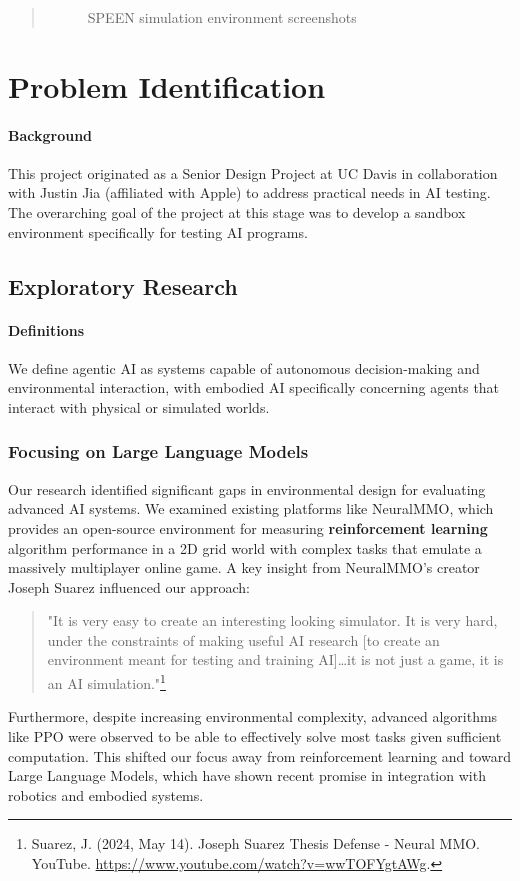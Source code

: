 \documentclass{article}
\begin{document}
\begin{abstract}
\begin{figure}[ht!]
\begin{minipage}[b]{0.49\textwidth}
        \end{minipage}
        \caption{SPEEN simulation environment screenshots}
        \label{fig:speen-environment}
    \end{figure}
\end{abstract}

\section{Problem Identification}

\paragraph{Background}
This project originated as a Senior Design Project at UC Davis in collaboration with Justin Jia (affiliated with Apple) to address practical needs in AI testing.
The overarching goal of the project at this stage was to develop a sandbox environment specifically for testing AI programs.

\subsection{Exploratory Research}

\paragraph{Definitions}
We define agentic AI as systems capable of autonomous decision-making and environmental interaction, with embodied AI specifically concerning agents that interact with physical or simulated worlds.

\subsubsection{Focusing on Large Language Models}
Our research identified significant gaps in environmental design for evaluating advanced AI systems.
We examined existing platforms like NeuralMMO, which provides an open-source environment for measuring \textbf{reinforcement learning} algorithm performance in a 2D grid world with complex tasks that emulate a massively multiplayer online game.
A key insight from NeuralMMO's creator Joseph Suarez influenced our approach:
\begin{quote}
    "It is very easy to create an interesting looking simulator. It is very hard, under the constraints of making useful AI research [to create an environment meant for testing and training AI]…it is not just a game, it is an AI simulation."\footnote{Suarez, J. (2024, May 14). Joseph Suarez Thesis Defense - Neural MMO. YouTube. \url{https://www.youtube.com/watch?v=wwTOFYgtAWg}.}
\end{quote}
Furthermore, despite increasing environmental complexity, advanced algorithms like PPO were observed to be able to effectively solve most tasks given sufficient computation.
This shifted our focus away from reinforcement learning and toward Large Language Models, which have shown recent promise in integration with robotics and embodied systems.
\end{document}
